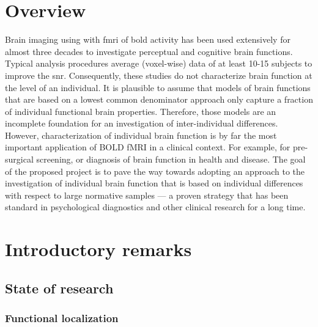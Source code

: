 \section{Overview}




%
Brain imaging using with \ac{fmri} of \ac{bold} activity has been used extensively for almost
three decades to investigate perceptual and cognitive brain functions.
%
Typical analysis procedures average (voxel-wise) data of at least 10-15 subjects
to improve the \ac{snr}.
%
Consequently, these studies do not characterize brain function at the level of
an individual.
%
It is plausible to assume that models of brain functions that are based on a
lowest common denominator approach only capture a fraction of individual
functional brain properties.
%
Therefore, those models are an incomplete foundation for an investigation of
inter-individual differences.
%
However, characterization of individual brain function is by far the most
important application of BOLD fMRI in a clinical context.
%
For example, for pre-surgical screening, or diagnosis of brain function in
health and disease.
%
The goal of the proposed project is to pave the way towards adopting an approach
to the investigation of individual brain function that is based on individual
differences with respect to large normative samples --- a proven strategy that
has been standard in psychological diagnostics and other clinical research for a
long time.


\section{Introductory remarks}


\subsection{State of research}


\subsubsection{Functional localization}

